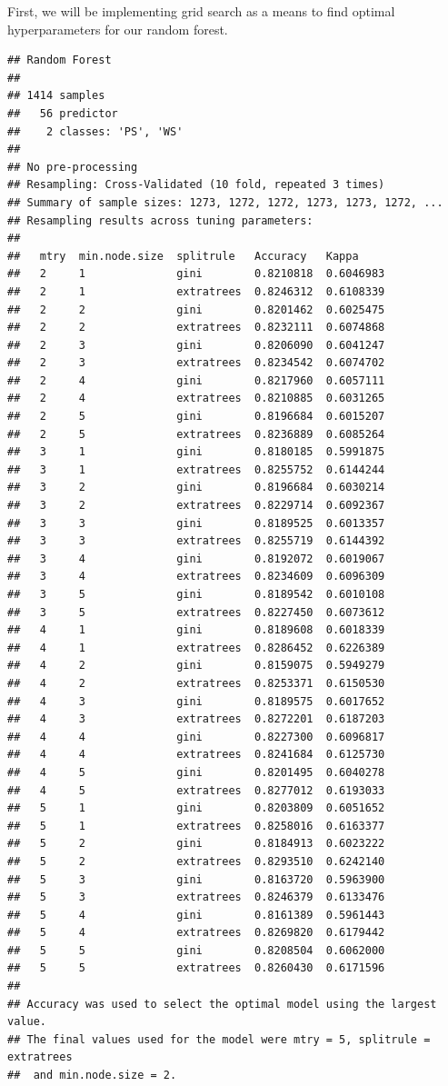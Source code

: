 \documentclass[12pt]{article}
\begin{document}
First, we will be implementing grid search as a means to find optimal
hyperparameters for our random forest.

\begin{verbatim}
## Random Forest 
## 
## 1414 samples
##   56 predictor
##    2 classes: 'PS', 'WS' 
## 
## No pre-processing
## Resampling: Cross-Validated (10 fold, repeated 3 times) 
## Summary of sample sizes: 1273, 1272, 1272, 1273, 1273, 1272, ... 
## Resampling results across tuning parameters:
## 
##   mtry  min.node.size  splitrule   Accuracy   Kappa    
##   2     1              gini        0.8210818  0.6046983
##   2     1              extratrees  0.8246312  0.6108339
##   2     2              gini        0.8201462  0.6025475
##   2     2              extratrees  0.8232111  0.6074868
##   2     3              gini        0.8206090  0.6041247
##   2     3              extratrees  0.8234542  0.6074702
##   2     4              gini        0.8217960  0.6057111
##   2     4              extratrees  0.8210885  0.6031265
##   2     5              gini        0.8196684  0.6015207
##   2     5              extratrees  0.8236889  0.6085264
##   3     1              gini        0.8180185  0.5991875
##   3     1              extratrees  0.8255752  0.6144244
##   3     2              gini        0.8196684  0.6030214
##   3     2              extratrees  0.8229714  0.6092367
##   3     3              gini        0.8189525  0.6013357
##   3     3              extratrees  0.8255719  0.6144392
##   3     4              gini        0.8192072  0.6019067
##   3     4              extratrees  0.8234609  0.6096309
##   3     5              gini        0.8189542  0.6010108
##   3     5              extratrees  0.8227450  0.6073612
##   4     1              gini        0.8189608  0.6018339
##   4     1              extratrees  0.8286452  0.6226389
##   4     2              gini        0.8159075  0.5949279
##   4     2              extratrees  0.8253371  0.6150530
##   4     3              gini        0.8189575  0.6017652
##   4     3              extratrees  0.8272201  0.6187203
##   4     4              gini        0.8227300  0.6096817
##   4     4              extratrees  0.8241684  0.6125730
##   4     5              gini        0.8201495  0.6040278
##   4     5              extratrees  0.8277012  0.6193033
##   5     1              gini        0.8203809  0.6051652
##   5     1              extratrees  0.8258016  0.6163377
##   5     2              gini        0.8184913  0.6023222
##   5     2              extratrees  0.8293510  0.6242140
##   5     3              gini        0.8163720  0.5963900
##   5     3              extratrees  0.8246379  0.6133476
##   5     4              gini        0.8161389  0.5961443
##   5     4              extratrees  0.8269820  0.6179442
##   5     5              gini        0.8208504  0.6062000
##   5     5              extratrees  0.8260430  0.6171596
## 
## Accuracy was used to select the optimal model using the largest value.
## The final values used for the model were mtry = 5, splitrule = extratrees
##  and min.node.size = 2.
\end{verbatim}
\end{document}
